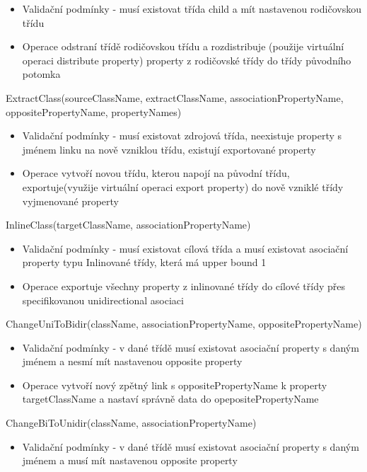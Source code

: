 \documentclass[11pt,twoside,a4paper]{book}
\begin{document}
\begin{list}{Operace :}{}
  \begin{itemize}
    \item Validační podmínky - musí existovat třída child a mít nastavenou
    rodičovskou třídu
    \item Operace odstraní třídě rodičovskou třídu a rozdistribuje (použije
    virtuální operaci distribute property) property z rodičovské třídy do třídy původního potomka
  \end{itemize}
  \item ExtractClass(sourceClassName, extractClassName, associationPropertyName, oppositePropertyName, propertyNames)
  \begin{itemize}
    \item Validační podmínky - musí existovat zdrojová třída, neexistuje
    property s jménem linku na nově vzniklou třídu, existují exportované property
    \item Operace vytvoří novou třídu, kterou napojí na původní třídu,
    exportuje(využije virtuální operaci export property) do nově vzniklé třídy
    vyjmenované property
  \end{itemize}
  \item InlineClass(targetClassName, associationPropertyName)
  \begin{itemize}
    \item Validační podmínky - musí existovat cílová třída a
    musí existovat asociační property typu Inlinované třídy, která má upper
    bound 1
    \item Operace exportuje všechny property z inlinované třídy do cílové třídy
    přes specifikovanou unidirectional asociaci
  \end{itemize}
  \item ChangeUniToBidir(className, associationPropertyName, oppositePropertyName)
  \begin{itemize}
    \item Validační podmínky - v dané třídě musí existovat asociační property
    s daným jménem a nesmí mít nastavenou opposite property 
    \item Operace vytvoří nový zpětný link s oppositePropertyName k property
    targetClassName a nastaví správně data do opepositePropertyName
  \end{itemize}
  \item ChangeBiToUnidir(className, associationPropertyName)
  \begin{itemize}
    \item Validační podmínky - v dané třídě musí existovat asociační property
    s daným jménem a musí mít nastavenou opposite property

\end{itemize}
\end{list}
\end{document}
